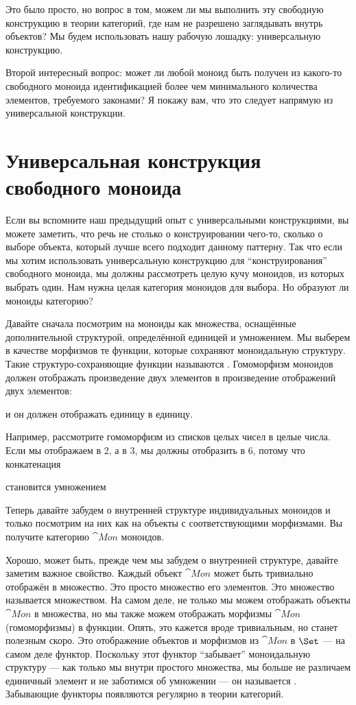 Это было просто, но вопрос в том, можем ли мы выполнить эту свободную
конструкцию в теории категорий, где нам не разрешено заглядывать внутрь
объектов? Мы будем использовать нашу рабочую лошадку: универсальную конструкцию.

Второй интересный вопрос: может ли любой моноид быть получен из какого-то
свободного моноида идентификацией более чем минимального количества элементов,
требуемого законами? Я покажу вам, что это следует напрямую из
универсальной конструкции.

\section{Универсальная конструкция свободного моноида}

Если вы вспомните наш предыдущий опыт с универсальными конструкциями, вы
можете заметить, что речь не столько о конструировании чего-то, сколько о
выборе объекта, который лучше всего подходит данному паттерну. Так что если мы хотим использовать
универсальную конструкцию для ``конструирования'' свободного моноида, мы должны
рассмотреть целую кучу моноидов, из которых выбрать один. Нам нужна
целая категория моноидов для выбора. Но образуют ли моноиды категорию?

Давайте сначала посмотрим на моноиды как множества, оснащённые дополнительной структурой,
определённой единицей и умножением. Мы выберем в качестве морфизмов те
функции, которые сохраняют моноидальную структуру. Такие
структуро-сохраняющие функции называются . Гомоморфизм моноидов
должен отображать произведение двух элементов в произведение
отображений двух элементов:

и он должен отображать единицу в единицу.

Например, рассмотрите гомоморфизм из списков целых чисел в
целые числа. Если мы отображаем \code{{[}2{]}} в 2, а \code{{[}3{]}} в 3, мы
должны отобразить \code{{[}2, 3{]}} в 6, потому что конкатенация

становится умножением

Теперь давайте забудем о внутренней структуре индивидуальных моноидов и
только посмотрим на них как на объекты с соответствующими морфизмами. Вы получите
категорию $\cat{Mon}$ моноидов.

Хорошо, может быть, прежде чем мы забудем о внутренней структуре, давайте заметим
важное свойство. Каждый объект $\cat{Mon}$ может быть тривиально отображён
в множество. Это просто множество его элементов. Это множество называется
 множеством. На самом деле, не только мы можем отображать объекты
$\cat{Mon}$ в множества, но мы также можем отображать морфизмы $\cat{Mon}$
(гомоморфизмы) в функции. Опять, это кажется вроде тривиальным, но
станет полезным скоро. Это отображение объектов и морфизмов из
$\cat{Mon}$ в $\Set$ --- на самом деле функтор. Поскольку этот функтор
``забывает'' моноидальную структуру --- как только мы внутри простого множества,
мы больше не различаем единичный элемент и не заботимся об умножении
--- он называется . Забывающие функторы появляются
регулярно в теории категорий.

